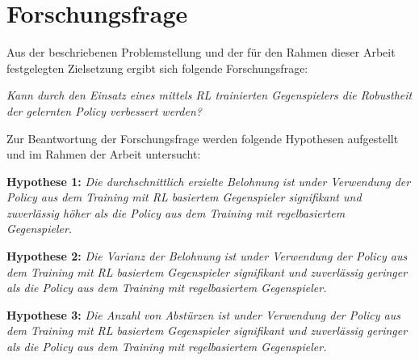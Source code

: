 \section{Forschungsfrage}

Aus der beschriebenen Problemstellung und der für den Rahmen dieser Arbeit festgelegten Zielsetzung ergibt sich folgende Forschungsfrage: 

\textit{Kann durch den Einsatz eines mittels RL trainierten Gegenspielers die Robustheit der gelernten Policy verbessert werden?}

Zur Beantwortung der Forschungsfrage werden folgende Hypothesen aufgestellt und im Rahmen der Arbeit untersucht:

\textbf{Hypothese 1:}
\textit{Die durchschnittlich erzielte Belohnung ist under Verwendung der Policy aus dem Training mit RL basiertem Gegenspieler signifikant und zuverlässig höher als die Policy aus dem Training mit regelbasiertem Gegenspieler.}

\textbf{Hypothese 2:}
\textit{Die Varianz der Belohnung ist under Verwendung der Policy aus dem Training mit RL basiertem Gegenspieler signifikant und zuverlässig geringer als die Policy aus dem Training mit regelbasiertem Gegenspieler.}

\textbf{Hypothese 3:}
\textit{Die Anzahl von Abstürzen ist under Verwendung der Policy aus dem Training mit RL basiertem Gegenspieler signifikant und zuverlässig geringer als die Policy aus dem Training mit regelbasiertem Gegenspieler.}

